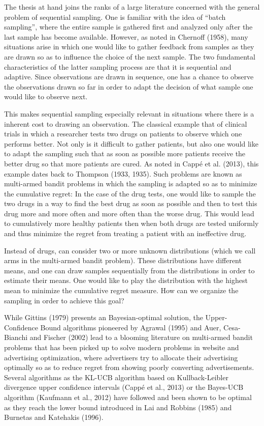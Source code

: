 \documentclass[12pt,]{article}
\begin{document}
The thesis at hand joins the ranks of a large literature concerned with
the general problem of sequential sampling. One is familiar with the
idea of ``batch sampling'', where the entire sample is gathered first
and analyzed only after the last sample has become available. However,
as noted in Chernoff (1958), many situations arise in which one would
like to gather feedback from samples as they are drawn so as to
influence the choice of the next sample. The two fundamental
characteristics of the latter sampling process are that it is sequential
and adaptive. Since observations are drawn in sequence, one has a chance
to observe the observations drawn so far in order to adapt the decision
of what sample one would like to observe next.

This makes sequential sampling especially relevant in situations where
there is a inherent cost to drawing an observation. The classical
example that of clinical trials in which a researcher tests two drugs on
patients to observe which one performs better. Not only is it difficult
to gather patients, but also one would like to adapt the sampling such
that as soon as possible more patients receive the better drug so that
more patients are cured. As noted in Cappé et al. (2013), this example
dates back to Thompson (1933, 1935). Such problems are known as
multi-armed bandit problems in which the sampling is adapted so as to
minimize the cumulative regret: In the case of the drug tests, one would
like to sample the two drugs in a way to find the best drug as soon as
possible and then to test this drug more and more often and more often
than the worse drug. This would lead to cumulatively more healthy
patients then when both drugs are tested uniformly and thus minimize the
regret from treating a patient with an ineffective drug.

Instead of drugs, can consider two or more unknown distributions (which
we call arms in the multi-armed bandit problem). These distributions
have different means, and one can draw samples sequentially from the
distributions in order to estimate their means. One would like to play
the distribution with the highest mean to minimize the cumulative regret
measure. How can we organize the sampling in order to achieve this goal?

While Gittins (1979) presents an Bayesian-optimal solution, the
Upper-Confidence Bound algorithms pioneered by Agrawal (1995) and Auer,
Cesa-Bianchi and Fischer (2002) lead to a blooming literature on
multi-armed bandit problems that has been picked up to solve modern
problems in website and advertising optimization, where advertisers try
to allocate their advertising optimally so as to reduce regret from
showing poorly converting advertisements. Several algorithms as the
KL-UCB algorithm based on Kullback-Leibler divergence upper confidence
intervals (Cappé et al., 2013) or the Bayes-UCB algorithm (Kaufmann et
al., 2012) have followed and been shown to be optimal as they reach the
lower bound introduced in Lai and Robbins (1985) and Burnetas and
Katehakis (1996).
\end{document}
